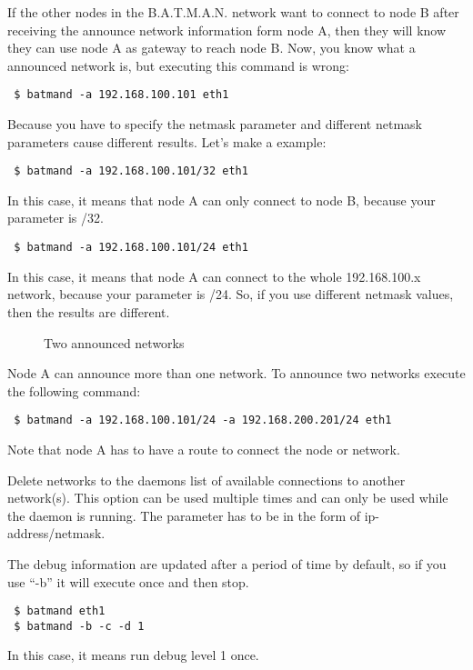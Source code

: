 If the other nodes in the B.A.T.M.A.N. network want to connect to node B after
receiving the announce network information form node A, then they will know they
can use node A as gateway to reach node B. Now, you know what a announced
network is, but executing this command is wrong:
\begin{verbatim}
 $ batmand -a 192.168.100.101 eth1
\end{verbatim}

Because you have to specify the netmask parameter and different netmask
parameters cause different results. Let's make a example:
\begin{verbatim}
 $ batmand -a 192.168.100.101/32 eth1
\end{verbatim}
In this case, it means that node A can only connect to node B, because your
parameter is /32.

\begin{verbatim}
 $ batmand -a 192.168.100.101/24 eth1
\end{verbatim}
In this case, it means that node A can connect to the whole 192.168.100.x
network, because your parameter is /24. So, if you use different netmask values,
then the results are different.

\begin{figure}[H]
 \begin{center}
  
 \end{center}
  \caption{Two announced networks}
\end{figure}

Node A can announce more than one network. To announce two networks execute the
following command:
\begin{verbatim}
 $ batmand -a 192.168.100.101/24 -a 192.168.200.201/24 eth1
\end{verbatim}
Note that node A has to have a route to connect the node or network.

Delete networks to the daemons list of available connections to another
network(s). This option can be used multiple times and can only be used while
the daemon is running. The parameter has to be in the form of
ip-address/netmask.

The debug information are updated after a period of time by default, so if you
use ``-b'' it will execute once and then stop.
\begin{verbatim}
 $ batmand eth1
 $ batmand -b -c -d 1
\end{verbatim}
In this case, it means run debug level 1 once.

